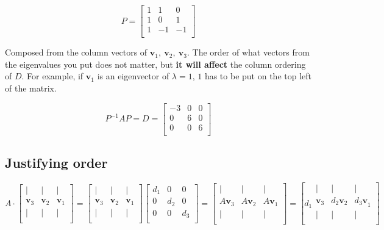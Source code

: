 \documentclass[12pt]{article}
\theoremstyle{plain}
\theoremstyle{remark}
\theoremstyle{definition}
\begin{document}
\[P = \begin{bmatrix}
1 & 1 & 0 \\
1 & 0 & 1 \\
1 & - 1 & - 1 \\
\end{bmatrix}\]

Composed from the column vectors of
\({\mathbf{v}}_{1},\ {\mathbf{v}}_{2},\ {\mathbf{v}}_{3}\).
The order of what vectors from the eigenvalues you put does not matter,
but \textbf{it will affect} the column ordering of \(D\). For example,
if \({\mathbf{v}}_{1}\) is an eigenvector of \(\lambda = 1\), \(1\)
has to be put on the top left of the matrix.

\[P^{- 1}AP = D = \begin{bmatrix}
 - 3 & 0 & 0 \\
0 & 6 & 0 \\
0 & 0 & 6 \\
\end{bmatrix}\]


\subsection{\texorpdfstring{ Justifying
order}{ Justifying order}}

\[{A \cdot \begin{bmatrix}
 \mid & \mid & \mid \\
{\mathbf{v}}_{3} & {\mathbf{v}}_{2} & {\mathbf{v}}_{1} \\
 \mid & \mid & \mid \\
\end{bmatrix} }{= \begin{bmatrix}
 \mid & \mid & \mid \\
{\mathbf{v}}_{3} & {\mathbf{v}}_{2} & {\mathbf{v}}_{1} \\
 \mid & \mid & \mid \\
\end{bmatrix}\begin{bmatrix}
d_{1} & 0 & 0 \\
0 & d_{2} & 0 \\
0 & 0 & d_{3} \\
\end{bmatrix} }{= \begin{bmatrix}
 \mid & \mid & \mid \\
{A\mathbf{v}}_{3} & A{\mathbf{v}}_{2} & A{\mathbf{v}}_{1} \\
 \mid & \mid & \mid \\
\end{bmatrix} }{= \left\lbrack d_{1}\begin{matrix}
 \mid & \mid & \mid \\
{\mathbf{v}}_{3} & d_{2}{\mathbf{v}}_{2} & {d_{3}\mathbf{v}}_{1} \\
 \mid & \mid & \mid \\
\end{matrix} \right\rbrack} \]
\end{document}
